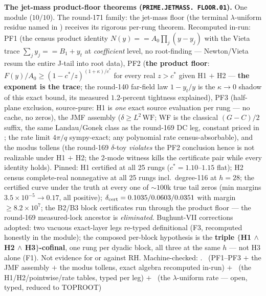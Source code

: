 \par\smallskip\noindent\textbf{The jet-mass product-floor
theorems (\texttt{PRIME.\allowbreak JETMASS.\allowbreak
FLOOR.01}).}
One module ($10/10$).  The round-171 family: the jet-mass floor
(the terminal $\lambda$-uniform residue named in
) receives its rigorous
per-rung theorem.  Recomputed in-run: PF1 (the census product
identity $N(y) == A_0 \prod_j (y - y_j)$ with the Vieta trace
$\sum_j y_j == B_1 + y_t$ at \emph{coefficient} level, no
root-finding --- Newton/Vieta resum the entire J-tail into root
data), PF2 (\textbf{the product floor}: $F(y)/A_0 \ge
(1 - c^*/z)^{(1 + \kappa)/c^*}$ for every real $z > c^*$ given
H1 $+$ H2 --- \textbf{the exponent is the trace}; the round-140
far-field law $1 - y_t/y$ is the $\kappa \to 0$ shadow of this
exact bound, its measured $1.2$-percent tightness explained),
PF3 (half-plane exclusion, source-pure: H1 is \emph{one} exact
source evaluation per rung --- no cache, no zeros), the JMF
assembly ($\delta \ge L^2\,\mathrm{WF}$; WF is the classical
$(G - C)/2$ suffix, the same Landau/Gonek class as the round-169
DC leg, constant priced in
; the rate limit
$4\pi/q$ sympy-exact; any polynomial rate census-absorbable),
and the modus tollens (the round-169 $\delta$-toy \emph{violates}
the PF2 conclusion hence is not realizable under H1 $+$ H2; the
2-mode witness kills the certificate pair while every identity
holds).  Pinned: H1 certified at all 25 rungs ($c^* =
1.10$--$1.15$ flat); H2 census complete-real nonnegative at all
25 rungs incl.\ degree-116 at $h = 28$; the certified curve
under the truth at every one of ${\sim}100$k true tail zeros
(min margins $3.5\times10^{-5} \to 0.17$, all positive);
$\delta_{\rm cert} = 0.1035/0.0603/0.0351$ with margin $\ge
8.2\times10^{7}$; the B2/B3 block certificates run through the
product floor --- the round-169 measured-lock ancestor is
\emph{eliminated}.  Bughunt-VII corrections adopted: two vacuous
exact-layer legs re-typed definitional (F3, recomputed honestly
in the module); the composed per-block hypothesis is the
\textbf{triple $\{$H1 $\wedge$ H2 $\wedge$ H3$\}$-cofinal}, one
rung per dyadic block, all three at the same $h$ --- not H3
alone (F1).  Not evidence for or against RH.
Machine-checked: .
\mE\ (PF1--PF3 $+$ the JMF assembly $+$ the modus tollens, exact
algebra recomputed in-run) $+$ \mC\ (the H1/H2/pointwise/rate
tables, typed per leg) $+$ \mO\ (the $\lambda$-uniform rate ---
open, typed, reduced to TOPROOT)
\par\smallskip


